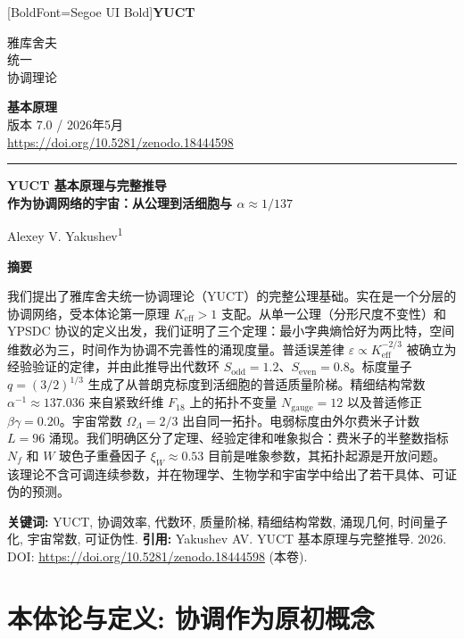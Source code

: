 \documentclass[12pt,a4paper]{article}
\newcommand{\makeheader}{%
	\noindent
	\begin{minipage}{0.17\textwidth}
		\raggedright
		{\fontspec{Segoe UI}[BoldFont=Segoe UI Bold]\bfseries\color{skyblue}\fontsize{46}{46}\selectfont YUCT}%
	\end{minipage}%
	\hspace{30pt}
	\begin{minipage}{0.32\textwidth}
		\raggedright
		{\sffamily\fontsize{11}{13}\selectfont 雅库舍夫\\ 统一\\ 协调理论}%
	\end{minipage}%
	\hfill
	\begin{minipage}{0.38\textwidth}
		\raggedleft
		{\sffamily\bfseries 基本原理}\\ 
		{\sffamily 版本 7.0 / 2026年5月}\\ 
		{\sffamily\footnotesize \scriptsize \url{https://doi.org/10.5281/zenodo.18444598}}%
	\end{minipage}
	\par\vspace{5pt}
	\noindent\textcolor{gold}{\rule{\textwidth}{1.6pt}}
	\par\vspace{0pt}
}
\begin{document}
	
	\thispagestyle{firstpage}
	\makeheader
	
	\vspace{0cm}
	{\LARGE\bfseries YUCT 基本原理与完整推导 \\
		\Large 作为协调网络的宇宙：从公理到活细胞与 \(\alpha \approx 1/137\) \par}
	\vspace{0.2cm}
	
	{\large Alexey V. Yakushev\textsuperscript{1}} \\
	\vspace{0.0cm}
	
	{\color{darkblue}\textbf{\LARGE 摘要}} \par
	{\large
		\noindent
		我们提出了雅库舍夫统一协调理论（YUCT）的完整公理基础。实在是一个分层的协调网络，受本体论第一原理 \(K_{\mathrm{eff}} > 1\) 支配。从单一公理（分形尺度不变性）和 YPSDC 协议的定义出发，我们证明了三个定理：最小字典熵恰好为两比特，空间维数必为三，时间作为协调不完善性的涌现度量。普适误差律 \(\varepsilon \propto K_{\mathrm{eff}}^{-2/3}\) 被确立为经验验证的定律，并由此推导出代数环 \(S_{\mathrm{odd}} = 1.2\)、\(S_{\mathrm{even}} = 0.8\)。标度量子 \(q = (3/2)^{1/3}\) 生成了从普朗克标度到活细胞的普适质量阶梯。精细结构常数 \(\alpha^{-1} \approx 137.036\) 来自紧致纤维 \(F_{18}\) 上的拓扑不变量 \(N_{\mathrm{gauge}} = 12\) 以及普适修正 \(\beta\gamma = 0.20\)。宇宙常数 \(\Omega_\Lambda = 2/3\) 出自同一拓扑。电弱标度由外尔费米子计数 \(L = 96\) 涌现。我们明确区分了定理、经验定律和唯象拟合：费米子的半整数指标 \(N_f\) 和 \(W\) 玻色子重叠因子 \(\xi_W \approx 0.53\) 目前是唯象参数，其拓扑起源是开放问题。该理论不含可调连续参数，并在物理学、生物学和宇宙学中给出了若干具体、可证伪的预测。
	}
	
	\vspace{0.1cm}
	\noindent
	{\color{darkblue}\textbf{关键词:}} YUCT, 协调效率, 代数环, 质量阶梯, 精细结构常数, 涌现几何, 时间量子化, 宇宙常数, 可证伪性.
	\vspace{0.1cm}
	\noindent
	{\color{darkblue}\textbf{引用:}} Yakushev AV. YUCT 基本原理与完整推导. 2026. DOI: \url{https://doi.org/10.5281/zenodo.18444598} (本卷).
	
	\vspace{0.4cm}
	
	\section{本体论与定义: 协调作为原初概念}
	\label{sec:ontology}
	
\end{document}
